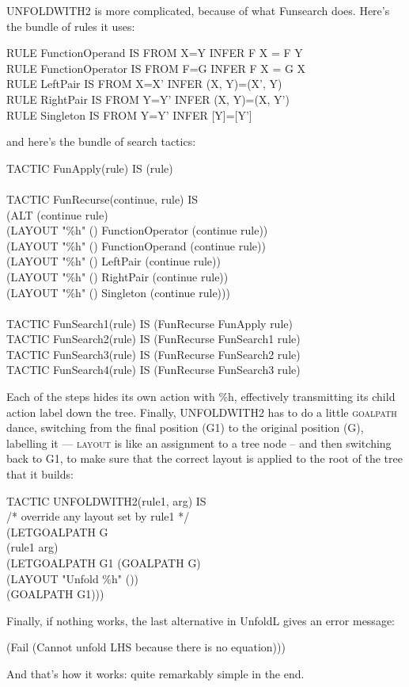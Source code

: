 UNFOLDWITH2 is more complicated, because of what Funsearch does. Here's the bundle of rules it uses:
\begin{japeish}
RULE FunctionOperand  IS FROM X=Y  INFER F X = F Y \\
RULE FunctionOperator IS FROM F=G  INFER F X = G X \\
RULE LeftPair         IS FROM X=X' INFER (X, Y)=(X', Y) \\
RULE RightPair        IS FROM Y=Y' INFER (X, Y)=(X, Y') \\
RULE Singleton        IS FROM Y=Y' INFER [Y]=[Y']
\end{japeish}
and here's the bundle of search tactics:
\begin{japeish}
TACTIC FunApply(rule) IS (rule) \\
\\
TACTIC FunRecurse(continue, rule) IS \\
\tab (ALT (continue rule) \\
\tab \tab (LAYOUT "\%h" ()  FunctionOperator (continue rule)) \\
\tab \tab (LAYOUT "\%h" ()  FunctionOperand  (continue rule)) \\
\tab \tab (LAYOUT "\%h" ()  LeftPair         (continue rule)) \\
\tab \tab (LAYOUT "\%h" ()  RightPair        (continue rule)) \\
\tab \tab (LAYOUT "\%h" ()  Singleton        (continue rule))) \\
\\
TACTIC FunSearch1(rule) IS (FunRecurse FunApply rule) \\
TACTIC FunSearch2(rule) IS (FunRecurse FunSearch1 rule) \\
TACTIC FunSearch3(rule) IS (FunRecurse FunSearch2 rule) \\
TACTIC FunSearch4(rule) IS (FunRecurse FunSearch3 rule) \\
\end{japeish}
Each of the steps hides its own action with \%h, effectively transmitting its child action label down the tree. Finally, UNFOLDWITH2 has to do a little \textsc{goalpath} dance, switching from the final position (G1) to the original position (G), labelling it --- \textsc{layout} is like an assignment to a tree node -- and then switching back to G1, to make sure that the correct layout is applied to the root of the tree that it builds:
\begin{japeish}
TACTIC UNFOLDWITH2(rule1, arg) IS \\
\tab /* override any layout set by rule1 */ \\
\tab (LETGOALPATH G \\ 
\tab \tab (rule1 arg) \\ 
\tab \tab (LETGOALPATH G1
\tab \tab \tab (GOALPATH G) \\ 
\tab \tab \tab (LAYOUT "Unfold \%h" ()) \\ 
\tab \tab \tab (GOALPATH G1)))
\end{japeish}
 
Finally, if nothing works, the last alternative in UnfoldL gives an error message:
\begin{japeish}
(Fail (Cannot unfold LHS because there is no equation)))
\end{japeish}

And that's how it works: quite remarkably simple in the end.